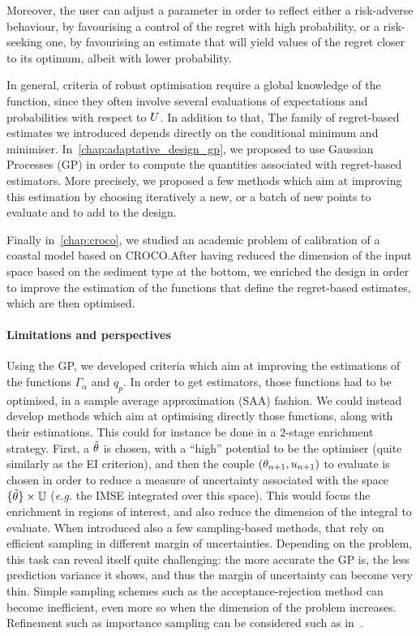 \documentclass[../../Main_ManuscritThese.tex]{subfiles}
\begin{document}
Moreover, the user can adjust a parameter in order to reflect either a
risk-adverse behaviour, by favourising a control of the regret with
high probability, or a risk-seeking one, by favourising an estimate
that will yield values of the regret closer to its optimum, albeit
with lower probability.


In general, criteria of robust optimisation require a global knowledge
of the function, since they often involve several evaluations of
expectations and probabilities with respect to $U$. In addition to
that, The family of regret-based estimates we introduced depends
directly on the conditional minimum and
minimiser. In~\cref{chap:adaptative_design_gp}, we proposed to use
Gaussian Processes (GP) in order to compute the quantities associated with
regret-based estimators. More precisely, we proposed a few methods
which aim at improving this estimation by choosing iteratively a new,
or a batch of new points to evaluate and to add to the design.

Finally in~\cref{chap:croco}, we studied an academic problem of
calibration of a coastal model based on CROCO.\@ After having reduced
the dimension of the input space based on the sediment type at the
bottom, we enriched the design in order to improve the estimation of
the functions that define the regret-based estimates, which are then
optimised.

\paragraph{Limitations and perspectives}

Using the GP, we developed criteria which aim at improving the
estimations of the functions $\Gamma_\alpha$ and $q_p$. In order to
get estimators, those functions had to be optimised, in a sample
average approximation (SAA) fashion. We could instead develop methods
which aim at optimising directly those functions, along with their
estimations. This could for instance be done in a $2$-stage enrichment
strategy. First, a $\tilde{\theta}$ is chosen, with a ``high'' potential
to be the optimiser (quite similarly as the EI criterion), and then
the couple $(\theta_{n+1}, u_{n+1})$ to evaluate is chosen in order to
reduce a measure of uncertainty associated with the space
$\{\tilde{\theta}\} \times \mathbb{U}$ (\emph{e.g.} the IMSE integrated over
this space). This would focus the enrichment in regions of interest,
and also reduce the dimension of the integral to evaluate.  When
introduced also a few sampling-based methods, that rely on efficient
sampling in different margin of uncertainties. Depending on the
problem, this task can reveal itself quite challenging: the more
accurate the GP is, the less prediction variance it shows, and thus
the margin of uncertainty can become very thin. Simple sampling
schemes such as the acceptance-rejection method can become
inefficient, even more so when the dimension of the problem
increases. Refinement such as importance sampling can be considered
such as in~\cite{razaaly_rare_2019}.
\end{document}
